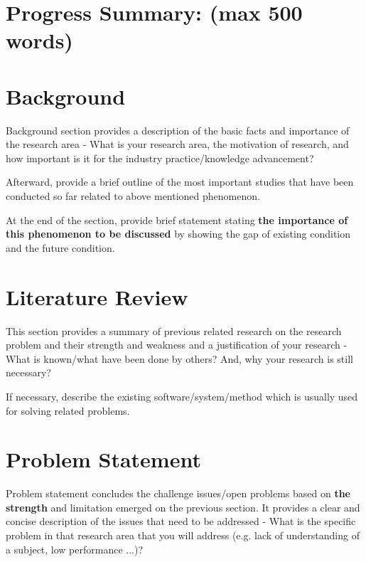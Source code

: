 \documentclass{ittelkom}
\begin{document}

\newpage
\normalsize
\tableofcontents

\newpage
\section*{Progress Summary: (max 500 words)}
\label{summary}

\section{Background} \label{background}
Background section provides a description of the basic facts and importance of
the research area - What is your research area, the motivation of research, and
how important is it for the industry practice/knowledge advancement?


Afterward, provide a brief outline of the most important studies that have been
conducted so far related to above mentioned phenomenon.

At the end of the section, provide brief statement stating {\bf the importance
        of this phenomenon to be discussed} by showing the gap of existing condition
and the future condition.

\section{Literature Review}
This section provides a summary of previous related research on the research
problem and their strength and weakness and a justification of your research -
What is known/what have been done by others? And, why your research is still
necessary?

If necessary, describe the existing software/system/method which is usually
used for solving related problems.

\section{Problem Statement}
Problem statement concludes the challenge issues/open problems based on {\bf
        the strength} and limitation emerged on the previous section. It provides a
clear and concise description of the issues that need to be addressed - What is
the specific problem in that research area that you will address (e.g. lack of
understanding of a subject, low performance ...)?
\end{document}
